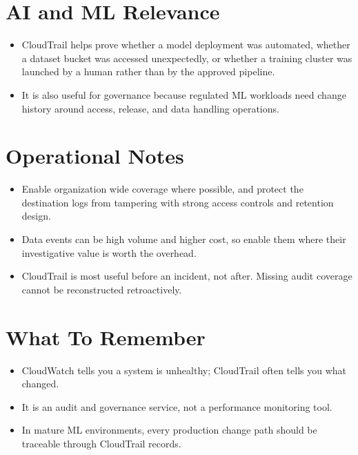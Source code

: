 \documentclass[10pt,twocolumn]{article}
\begin{document}
\section*{AI and ML Relevance}
\begin{itemize}
\item CloudTrail helps prove whether a model deployment was automated, whether a dataset bucket was accessed unexpectedly, or whether a training cluster was launched by a human rather than by the approved pipeline.
\item It is also useful for governance because regulated ML workloads need change history around access, release, and data handling operations.
\end{itemize}

\section*{Operational Notes}
\begin{itemize}
\item Enable organization wide coverage where possible, and protect the destination logs from tampering with strong access controls and retention design.
\item Data events can be high volume and higher cost, so enable them where their investigative value is worth the overhead.
\item CloudTrail is most useful before an incident, not after. Missing audit coverage cannot be reconstructed retroactively.
\end{itemize}

\section*{What To Remember}
\begin{itemize}
\item CloudWatch tells you a system is unhealthy; CloudTrail often tells you what changed.
\item It is an audit and governance service, not a performance monitoring tool.
\item In mature ML environments, every production change path should be traceable through CloudTrail records.
\end{itemize}
\end{document}
